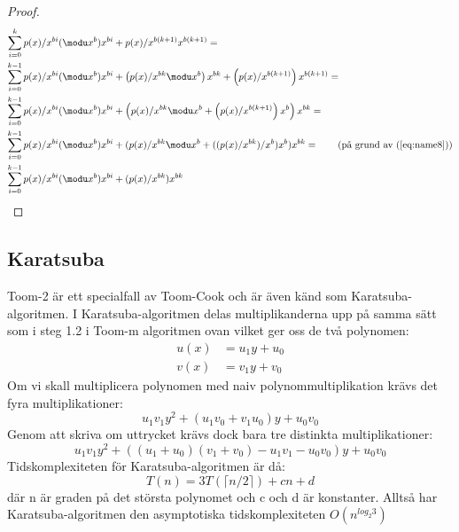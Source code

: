 \begin{proof}
  \begin{align*}
    \sum_{i = 0}^{k} p(x)/x^{bi} (\modu x^b) x^{bi} &+ p(x)/x^{b(k + 1)}  x^{b(k + 1)} =\\
    \sum_{i = 0}^{k-1} p(x)/x^{bi} (\modu x^b) x^{bi} &+
    \left(p(x)/x^{b k} \modu x^b\right) x^{b k} + \left(p(x)/x^{b(k + 1)}\right)  x^{b(k + 1)} = \\
    \sum_{i = 0}^{k-1} p(x)/x^{bi} (\modu x^b) x^{bi} &+
    \left(p(x)/x^{b k} \modu x^b + \left(p(x)/x^{b(k + 1)}\right)  x^b \right) x^{b k} = \\
    \sum_{i = 0}^{k-1} p(x)/x^{bi} (\modu x^b) x^{bi} &+
    (p(x)/x^{b k} \modu x^b + ((p(x)/x^{b k})/x^b)  x^b) x^{b k} =
    \tag{på grund av (\ref{eq:name8})}\\
    \sum_{i = 0}^{k-1} p(x)/x^{bi}  (\modu x^b) x^{bi} &+ (p(x)/x^{b k}) x^{b k}
  \end{align*}
\end{proof}

\subsection{Karatsuba}
Toom-2 är ett specialfall av Toom-Cook och är även känd som
Karatsuba-algoritmen. I Karatsuba-algoritmen delas multiplikanderna upp på
samma sätt som i steg 1.2 i Toom-m algoritmen ovan vilket ger oss de två
polynomen:
\begin{align*}
  u(x) &= u_1 y + u_0 \\
  v(x) &= v_1 y + v_0
\end{align*}
Om vi skall multiplicera polynomen med naiv polynommultiplikation krävs det
fyra multiplikationer:
\begin{equation*}
  u_1 v_1 y^2 + (u_1 v_0+v_1 u_0) y + u_0 v_0
\end{equation*}
Genom att skriva om uttrycket krävs dock bara tre distinkta multiplikationer:
\begin{equation*}
  u_1 v_1 y^2 + ((u_1 + u_0)(v_1 + v_0) - u_1 v_1 - u_0 v_0) y + u_0 v_0
\end{equation*}
Tidskomplexiteten för Karatsuba-algoritmen är då:
\begin{equation*}
  T(n) = 3 T(\lceil n/2\rceil) + cn + d
\end{equation*}
där n är graden på det största polynomet och c och d är konstanter. Alltså har
Karatsuba-algoritmen den asymptotiska tidskomplexiteten $O(n^{log_2 3})$
